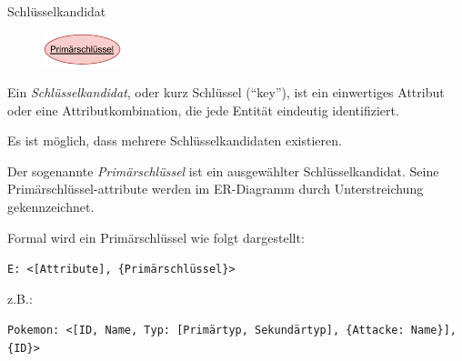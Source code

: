 \begin{defi}{Schlüsselkandidat}
    \begin{figure}
        \begin{center}
            \includegraphics[width=0.2\textwidth]{includes/figures/definition_entity_relationship_model_attribute_primary.pdf}
        \end{center}
    \end{figure}
    Ein \emph{Schlüsselkandidat}, oder kurz Schlüssel (\enquote{key}), ist ein einwertiges Attribut oder eine Attributkombination, die jede Entität eindeutig identifiziert.

    Es ist möglich, dass mehrere Schlüsselkandidaten existieren.

    Der sogenannte \emph{Primärschlüssel} ist ein ausgewählter Schlüsselkandidat.
    Seine Primärschlüssel-attribute werden im ER-Diagramm durch Unterstreichung gekennzeichnet.

    Formal wird ein Primärschlüssel wie folgt dargestellt:
    \begin{center}
        \texttt{E: <[Attribute], \{Primärschlüssel\}>}
    \end{center}
    z.B.:
    \begin{center}
        \texttt{Pokemon: <[ID, Name, Typ: [Primärtyp, Sekundärtyp], \{Attacke: Name\}], \{ID\}>}
    \end{center}
\end{defi}

